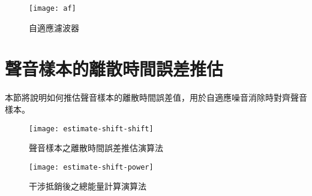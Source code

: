 \begin{figure}[H]
    \centering
    \texttt{[image: af]}
    \caption{自適應濾波器}\label{fig:af}
\end{figure}



\section{聲音樣本的離散時間誤差推估}\label{sec:estimate}

    本節將說明如何推估聲音樣本的離散時間誤差值，用於自適應噪音消除時對齊聲音樣本。

\begin{figure}[H]
    \centering
    \texttt{[image: estimate-shift-shift]}
    \caption{聲音樣本之離散時間誤差推估演算法}\label{fig:estimate-shift}
\end{figure}

\begin{figure}[H]
    \centering
    \texttt{[image: estimate-shift-power]}
    \caption{干涉抵銷後之總能量計算演算法}\label{fig:estimate-power}
\end{figure}

